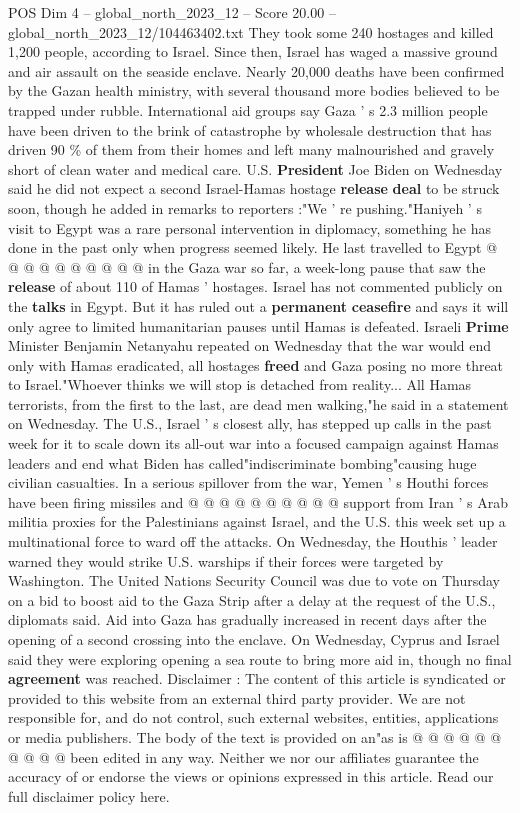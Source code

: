 \begin{textsample}{POS Dim 4 – global\_north\_2023\_12 – Score 20.00 – global\_north\_2023\_12/104463402.txt}
They took some 240 hostages and killed 1,200 people, according to Israel.
Since then, Israel has waged a massive ground and air assault on the seaside enclave.
Nearly 20,000 deaths have been confirmed by the Gazan health ministry, with several thousand more bodies believed to be trapped under rubble.
International aid groups say Gaza ' s 2.3 million people have been driven to the brink of catastrophe by wholesale destruction that has driven 90 \% of them from their homes and left many malnourished and gravely short of clean water and medical care.
U.S. \textbf{President} Joe Biden on Wednesday said he did not expect a second Israel-Hamas hostage \textbf{release} \textbf{deal} to be struck soon, though he added in remarks to reporters :"We ' re pushing."Haniyeh ' s visit to Egypt was a rare personal intervention in diplomacy, something he has done in the past only when progress seemed likely.
He last travelled to Egypt @ @ @ @ @ @ @ @ @ @ in the Gaza war so far, a week-long pause that saw the \textbf{release} of about 110 of Hamas ' hostages.
Israel has not commented publicly on the \textbf{talks} in Egypt.
But it has ruled out a \textbf{permanent} \textbf{ceasefire} and says it will only agree to limited humanitarian pauses until Hamas is defeated.
Israeli \textbf{Prime} Minister Benjamin Netanyahu repeated on Wednesday that the war would end only with Hamas eradicated, all hostages \textbf{freed} and Gaza posing no more threat to Israel."Whoever thinks we will stop is detached from reality...
All Hamas terrorists, from the first to the last, are dead men walking,"he said in a statement on Wednesday.
The U.S., Israel ' s closest ally, has stepped up calls in the past week for it to scale down its all-out war into a focused campaign against Hamas leaders and end what Biden has called"indiscriminate bombing"causing huge civilian casualties.
In a serious spillover from the war, Yemen ' s Houthi forces have been firing missiles and @ @ @ @ @ @ @ @ @ @ support from Iran ' s Arab militia proxies for the Palestinians against Israel, and the U.S. this week set up a multinational force to ward off the attacks.
On Wednesday, the Houthis ' leader warned they would strike U.S. warships if their forces were targeted by Washington.
The United Nations Security Council was due to vote on Thursday on a bid to boost aid to the Gaza Strip after a delay at the request of the U.S., diplomats said.
Aid into Gaza has gradually increased in recent days after the opening of a second crossing into the enclave.
On Wednesday, Cyprus and Israel said they were exploring opening a sea route to bring more aid in, though no final \textbf{agreement} was reached.
Disclaimer : The content of this article is syndicated or provided to this website from an external third party provider.
We are not responsible for, and do not control, such external websites, entities, applications or media publishers.
The body of the text is provided on an"as is @ @ @ @ @ @ @ @ @ @ been edited in any way.
Neither we nor our affiliates guarantee the accuracy of or endorse the views or opinions expressed in this article.
Read our full disclaimer policy here.


\end{textsample}
